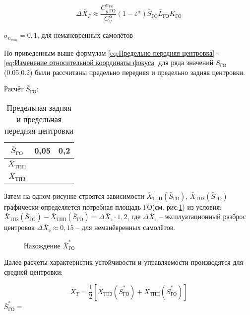 \begin{equation}
    \label{eq:Изменение относительной координаты фокуса}
    \Delta \bar{X}_F \approx \frac{C_{y \ \text{ГО}}^{\alpha_\text{ГО}}}{C_y^\alpha} (1 - \varepsilon^\alpha) \bar{S}_\text{ГО} \bar{L}_\text{ГО} K_\text{ГО}
\end{equation}

$\sigma_{n_{min}} = 0,1 $,  для неманёвренных самолётов

По приведенным выше формулам \ref{eq:Предельно передняя центровка} - \ref{eq:Изменение относительной координаты фокуса} для ряда значений $S_\text{ГО}$ (0.05,0.2) были рассчитаны предельно передняя и предельно задняя центровки.

\begin{center}
    Расчёт $\bar{S}_\text{ГО}$:
\end{center}

\begin{table}[H]
    \centering
        \caption{Предельная задняя и предельная передняя центровки }
    \begin{tabular}{|c|c|c|}
        \hline
        $\bar{S}_\text{ГО}$ & 0,05 & 0,2\\ \hline
        $\bar{X}_\text{ТПП}$ &  & \\ \hline
        $\bar{X}_\text{ТПЗ}$ &  & \\ \hline
    \end{tabular}
    \label{tab:Предельная задняя и предельная передняя центровки}
\end{table}

Затем на одном рисунке строятся зависимости $\bar{X}_\text{ТПП}(\bar{S}_\text{ГО})$, $\bar{X}_\text{ТПЗ}(\bar{S}_\text{ГО})$ графически определяется потребная площадь ГО(см. рис.\ref{fig:Нахождение S_ГО}) из условия: $\bar{X}_\text{ТПЗ}(\bar{S}_\text{ГО}) -\bar{X}_\text{ТПП}(\bar{S}_\text{ГО}) = \Delta \bar{X}_\text{э} \cdot 1,2$, где $\Delta \bar{X}_\text{э}$ -- эксплуатационный разброс центровок 
$\Delta \bar{X}_\text{э} \approx 0,15$ -- для неманёвренных самолётов.

\begin{figure}[H]
    \caption{Нахождение $\bar{X}^*_\text{ГО}$}
    \label{fig:Нахождение S_ГО}
\end{figure}

Далее расчеты характеристик устойчивости и управляемости производятся для
средней центровки: 

\begin{equation}
    \label{eq:Средняя центровка}
    \bar{X}_T = \frac{1}{2} [\bar{X}_\text{ТПЗ}(\bar{S}^*_\text{ГО}) +\bar{X}_\text{ТПП}(\bar{S}^*_\text{ГО})]
\end{equation}
$\bar{S}_\text{ГО}^* = $

